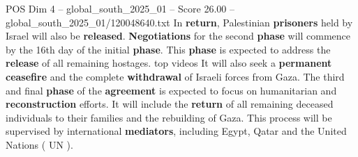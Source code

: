\begin{textsample}{POS Dim 4 – global\_south\_2025\_01 – Score 26.00 – global\_south\_2025\_01/120048640.txt}
In \textbf{return}, Palestinian \textbf{prisoners} held by Israel will also be \textbf{released}. \textbf{Negotiations} for the second \textbf{phase} will commence by the 16th day of the initial \textbf{phase}.
This \textbf{phase} is expected to address the \textbf{release} of all remaining hostages. top videos It will also seek a \textbf{permanent} \textbf{ceasefire} and the complete \textbf{withdrawal} of Israeli forces from Gaza.
The third and final \textbf{phase} of the \textbf{agreement} is expected to focus on humanitarian and \textbf{reconstruction} efforts.
It will include the \textbf{return} of all remaining deceased individuals to their families and the rebuilding of Gaza.
This process will be supervised by international \textbf{mediators}, including Egypt, Qatar and the United Nations ( UN ).

\end{textsample}
